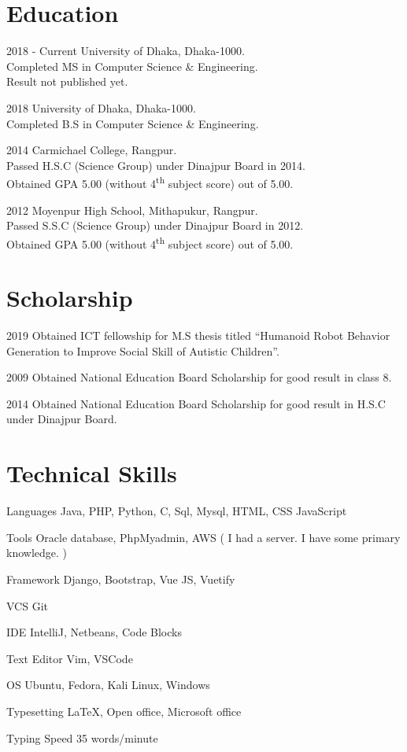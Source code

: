 \documentclass[a4paper,12pt]{article}
\begin{document}
\section{Education}

\begin{CV}
\item[2018 - Current] University of Dhaka, Dhaka-1000.\\ Completed MS in Computer Science \& Engineering.\\Result not published yet. 
\item[2018] University of Dhaka, Dhaka-1000.\\Completed B.S in Computer Science \& Engineering.
\item[2014] Carmichael College, Rangpur.\\Passed H.S.C (Science Group) under Dinajpur Board in 2014.\\Obtained GPA 5.00 (without 4\textsuperscript{th} subject score) out of 5.00.
\item[2012] Moyenpur High School, Mithapukur, Rangpur.\\Passed S.S.C (Science Group) under Dinajpur Board in 2012.\\Obtained GPA 5.00 (without 4\textsuperscript{th} subject score) out of 5.00.
\end{CV}

\section{Scholarship}
\begin{CV}
\item[2019] Obtained ICT fellowship for M.S thesis titled “Humanoid Robot Behavior Generation to Improve Social Skill of Autistic Children”.
\item[2009] Obtained National Education Board Scholarship for good result in class 8.
\item[2014] Obtained National Education Board Scholarship for good result in H.S.C under Dinajpur Board.
\end{CV}

\section{Technical Skills}
\begin{CV}
\item[Languages]  Java, PHP, Python, C, Sql, Mysql, HTML, CSS JavaScript
\item[Tools] Oracle database, PhpMyadmin, AWS ( I had a server. I have some primary knowledge. )
\item[Framework] Django, Bootstrap, Vue JS, Vuetify
\item[VCS] Git
\item[IDE] IntelliJ, Netbeans, Code Blocks
\item[Text Editor] Vim, VSCode
\item[OS] Ubuntu, Fedora, Kali Linux, Windows
\item[Typesetting] \LaTeX{}, Open office, Microsoft office
\item[Typing Speed] 35 words/minute 
\end{CV}
\newpage
\end{document}
